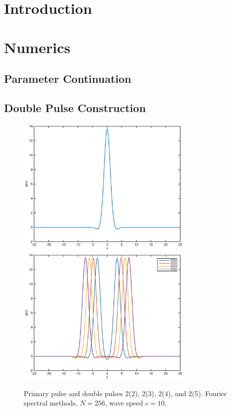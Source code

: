 \documentclass[12pt]{article}
\begin{document}
\section{Introduction}

\section{Numerics}

\subsection{Parameter Continuation}

\subsection{Double Pulse Construction}

\begin{figure}[H]
	\includegraphics[width=8.5cm]{four10primary.eps}
	\includegraphics[width=8.5cm]{four10double.eps}
	\caption{Primary pulse and double pulses 2(2), 2(3), 2(4), and 2(5). Fourier spectral methods, $N = 256$, wave speed $c = 10$.}
\end{figure}
\end{document}
